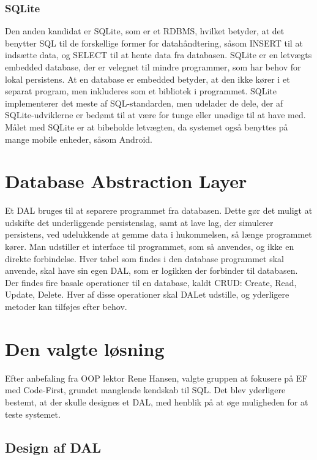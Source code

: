 \subsubsection*{SQLite}
Den anden kandidat er SQLite, som er et \ac{RDBMS}, hvilket betyder, at det benytter \ac{SQL} til de forskellige former for datahåndtering, såsom INSERT til at indsætte data, og SELECT til at hente data fra databasen.
SQLite er en letvægts embedded database, der er velegnet til mindre programmer, som har behov for lokal persistens.
At en database er embedded betyder, at den ikke kører i et separat program, men inkluderes som et bibliotek i programmet.
SQLite implementerer det meste af SQL-standarden, men udelader de dele, der af SQLite-udviklerne er bedømt til at være for tunge eller unødige til at have med.
Målet med SQLite er at bibeholde letvægten, da systemet også benyttes på mange mobile enheder, såsom Android.


\section{Database Abstraction Layer}
Et \ac{DAL} bruges til at separere programmet fra databasen.
Dette gør det muligt at udskifte det underliggende persistenslag, samt at lave lag, der simulerer persistens, ved udelukkende at gemme data i hukommelsen, så længe programmet kører.
Man udstiller et interface til programmet, som så anvendes, og ikke en direkte forbindelse.
Hver tabel som findes i den database programmet skal anvende, skal have sin egen \ac{DAL}, som er logikken der forbinder til databasen.
Der findes fire basale operationer til en database, kaldt CRUD: Create, Read, Update, Delete. 
Hver af disse operationer skal DALet udstille, og yderligere metoder kan tilføjes efter behov.

\section{Den valgte løsning}

Efter anbefaling fra OOP lektor Rene Hansen, valgte gruppen at fokusere på \acl{EF} med Code-First, grundet manglende kendskab til \ac{SQL}.
Det blev yderligere bestemt, at der skulle designes et \ac{DAL}, med henblik på at øge muligheden for at teste systemet.

\subsection{Design af \ac{DAL}}

